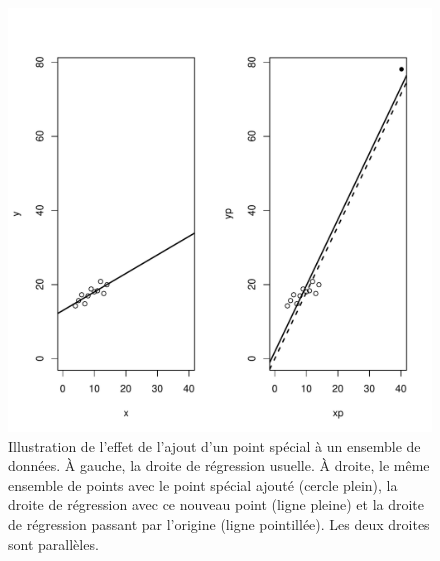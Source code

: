 \begin{solution}{2.10}
    \begin{figure}
      \centering
\begin{knitrout}
\color{fgcolor}
\includegraphics[width=\maxwidth]{figure/unnamed-chunk-22-1}

\end{knitrout}
      \caption{Illustration de l'effet de l'ajout d'un point spécial à
        un ensemble de données. À gauche, la droite de régression
        usuelle. À droite, le même ensemble de points avec le point
        spécial ajouté (cercle plein), la droite de régression avec ce
        nouveau point (ligne pleine) et la droite de régression
        passant par l'origine (ligne pointillée). Les deux droites
        sont parallèles.}
      \label{fig:simple:pointmagique}
    \end{figure}
  
\end{solution}
